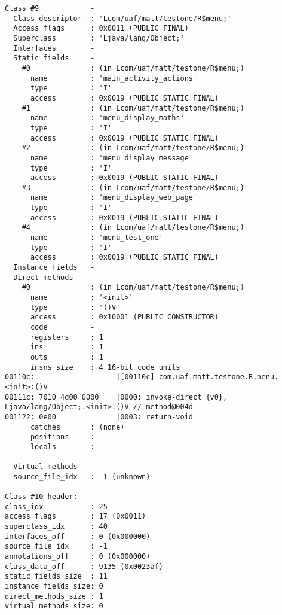 \begin{lstlisting}
Class #9            -
  Class descriptor  : 'Lcom/uaf/matt/testone/R$menu;'
  Access flags      : 0x0011 (PUBLIC FINAL)
  Superclass        : 'Ljava/lang/Object;'
  Interfaces        -
  Static fields     -
    #0              : (in Lcom/uaf/matt/testone/R$menu;)
      name          : 'main_activity_actions'
      type          : 'I'
      access        : 0x0019 (PUBLIC STATIC FINAL)
    #1              : (in Lcom/uaf/matt/testone/R$menu;)
      name          : 'menu_display_maths'
      type          : 'I'
      access        : 0x0019 (PUBLIC STATIC FINAL)
    #2              : (in Lcom/uaf/matt/testone/R$menu;)
      name          : 'menu_display_message'
      type          : 'I'
      access        : 0x0019 (PUBLIC STATIC FINAL)
    #3              : (in Lcom/uaf/matt/testone/R$menu;)
      name          : 'menu_display_web_page'
      type          : 'I'
      access        : 0x0019 (PUBLIC STATIC FINAL)
    #4              : (in Lcom/uaf/matt/testone/R$menu;)
      name          : 'menu_test_one'
      type          : 'I'
      access        : 0x0019 (PUBLIC STATIC FINAL)
  Instance fields   -
  Direct methods    -
    #0              : (in Lcom/uaf/matt/testone/R$menu;)
      name          : '<init>'
      type          : '()V'
      access        : 0x10001 (PUBLIC CONSTRUCTOR)
      code          -
      registers     : 1
      ins           : 1
      outs          : 1
      insns size    : 4 16-bit code units
00110c:                   |[00110c] com.uaf.matt.testone.R.menu.<init>:()V
00111c: 7010 4d00 0000    |0000: invoke-direct {v0}, Ljava/lang/Object;.<init>:()V // method@004d
001122: 0e00              |0003: return-void
      catches       : (none)
      positions     :
      locals        :

  Virtual methods   -
  source_file_idx   : -1 (unknown)

Class #10 header:
class_idx           : 25
access_flags        : 17 (0x0011)
superclass_idx      : 40
interfaces_off      : 0 (0x000000)
source_file_idx     : -1
annotations_off     : 0 (0x000000)
class_data_off      : 9135 (0x0023af)
static_fields_size  : 11
instance_fields_size: 0
direct_methods_size : 1
virtual_methods_size: 0


\end{lstlisting}
